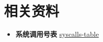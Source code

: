 \chapter{相关资料}

\begin{itemize}
    \item \textbf{系统调用号表} \href{https://gpages.juszkiewicz.com.pl/syscalls-table/syscalls.html}{syscalls-table}
\end{itemize}